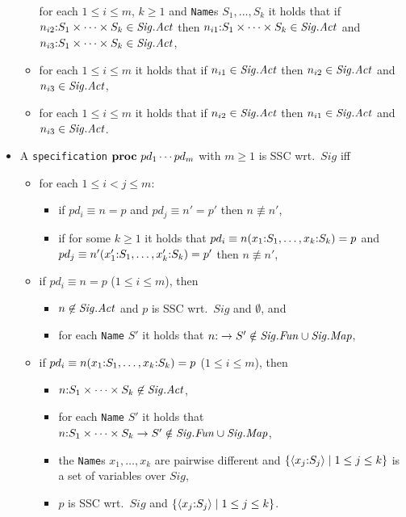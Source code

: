 \documentclass[twoside,fleqn,a4paper,dvips]{article}
\newcommand{\Sig}{\nm{Sig}}
\newcommand{\Fun}{\nm{Fun}}
\begin{document}
\begin{defn}[\tt Specification]
\begin{itemize}
\begin{itemize}
for each $1\leq i\leq m$, $k\geq 1$ and {\tt Name}s $S_1,\ldots,S_k$ it
holds
that if $n_{i2}\ap S_1\times\cdots\times S_k\in \Sig.\Act$ then
$n_{i1}\ap S_1\times\cdots\times
S_k\in \Sig.\Act$ and $n_{i3}\ap S_1\times\cdots\times S_k\in \Sig.\Act$,
\item
for each $1\leq i\leq m$ it holds
that if $n_{i1}\in \Sig.\Act$ then
$n_{i2}\in \Sig.\Act$ and $n_{i3}\in \Sig.\Act$,
\item
for each $1\leq i\leq m$ it holds
that if $n_{i2}\in \Sig.\Act$ then
$n_{i1}\in \Sig.\Act$ and $n_{i3}\in \Sig.\Act$.
\end{itemize}
\item
A {\tt specification} 
$\mathbf{proc}~pd_1\cdots pd_m$
with $m\geq 1$ is SSC wrt.\ $Sig$ iff
\begin{itemize}
\item
for each $1\leq i<j\leq m$:
\begin{itemize}
\item
if $pd_i\equiv n=p$ and $pd_j\equiv n'=p'$ then $n\not\equiv
n'$,
\item
if for some $k\geq1$ it holds that $pd_i\equiv
n(x_1{:} S_1,\ldots,x_k{:} S_k)=p$
and\\ $pd_j\equiv n'(x_1'{:} S_1,\ldots,x_k'{:} S_k)=p'$ then $n\not\equiv
n'$,
\end{itemize}
\item
if $pd_i\equiv n=p$ ($1\leq i\leq m$), then 
\begin{itemize}
\item
$n\not\in
\Sig.\Act$ and $p$ is SSC wrt.\ $Sig$ and $\emptyset$, and
\item
for each {\tt Name} $S'$ it holds that $n\ap \rightarrow S'\notin
\Sig.\Fun\cup\Sig.\Map$,
\end{itemize}
\item
if $pd_i\equiv n(x_{1}{:} S_{1},\ldots,x_{k}{:} S_{k})=p$
($1\leq i\leq m$), then
\begin{itemize}
\item $n\ap S_{1}\times\cdots\times S_{k}\not\in \Sig.\Act$,
\item
for each {\tt Name} $S'$ it holds that $n\ap S_{1}\times\cdots\times
S_{k}\rightarrow S'\notin \Sig.\Fun\cup\Sig.\Map$,
\item the {\tt Name}s $x_{1},\ldots,x_{k}$ are pairwise different
and $\{\langle x_{j}{:} S_{j}\rangle\mid 1\leq j\leq k\}$ is a set
of variables over $Sig$,
\item $p$ is SSC wrt.\ $Sig$ and $\{\langle
x_{j}{:} S_{j}\rangle\mid 1\leq j\leq k\}$.
\end{itemize}

\end{itemize}
\end{itemize}
\end{defn}
\end{document}

